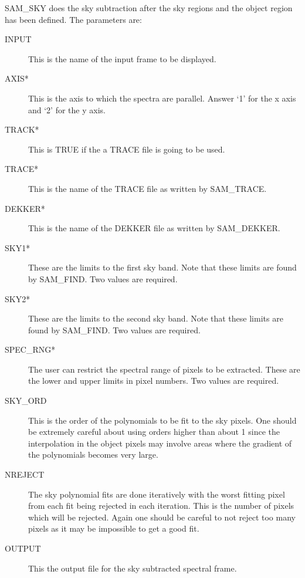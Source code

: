 SAM\_SKY does the sky subtraction after the sky regions and the object region
has been defined.  The parameters are:

\begin{description}
\begin{description}

\item[INPUT] This is the name of the input frame to be displayed.

\item[AXIS*] This is the axis to which the spectra are parallel.  Answer `1'
for the x axis and `2' for the y axis.

\item[TRACK*] This is TRUE if the a TRACE file is going to be used.

\item[TRACE*] This is the name of the TRACE file as written by SAM\_TRACE.

\item[DEKKER*] This is the name of the DEKKER file as written by SAM\_DEKKER.

\item[SKY1*] These are the limits to the first sky band.  Note that these
limits are found by SAM\_FIND.  Two values are required.

\item[SKY2*] These are the limits to the second sky band.  Note that these
limits are found by SAM\_FIND.  Two values are required.

\item[SPEC\_RNG*] The user can restrict the spectral range of pixels to be
extracted. These are the lower and upper limits in pixel numbers.  Two values
are required.

\item[SKY\_ORD] This is the order of the polynomials to be fit to the sky
pixels.  One should be extremely careful about using orders higher than about
1 since the interpolation in the object pixels may involve areas where the
gradient of the polynomials becomes very large.

\item[NREJECT]  The sky polynomial fits are done iteratively with the worst
fitting pixel from each fit being rejected in each iteration.  This is the
number of pixels which will be rejected.  Again one should be careful to not
reject too many pixels as it may be impossible to get a good fit.

\item[OUTPUT] This the output file for the sky subtracted spectral frame.

\end{description}
\end{description}

